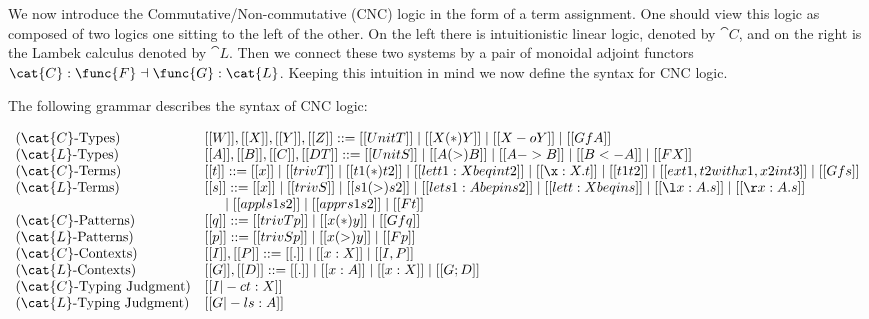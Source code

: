 We now introduce the Commutative/Non-commutative (CNC) logic in the
form of a term assignment.  One should view this logic as composed of
two logics one sitting to the left of the other.  On the left there is
intuitionistic linear logic, denoted by $\cat{C}$, and on the right is
the Lambek calculus denoted by $\cat{L}$.  Then we connect these two
systems by a pair of monoidal adjoint functors $\cat{C} : \func{F}
\dashv \func{G} : \cat{L}$.  Keeping this intuition in mind we now
define the syntax for CNC logic.
\begin{definition}
  \label{def:Lambek-syntax}
  The following grammar describes the syntax of CNC logic:
  \begin{center}\vspace{-5px}
    \begin{math}
      \begin{array}{lll}        
        \text{($\cat{C}$-Types)} & [[W]],[[X]],[[Y]],[[Z]] ::= [[UnitT]] \mid [[X (*) Y]] \mid [[X -o Y]] \mid [[Gf A]]\\
        \text{($\cat{L}$-Types)} & [[A]],[[B]],[[C]],[[DT]] ::= [[UnitS]] \mid [[A (>) B]] \mid [[A -> B]] \mid [[B <- A]] \mid [[F X]]\\        
        \text{($\cat{C}$-Terms)} & [[t]] ::= [[x]] \mid [[trivT]] \mid [[t1 (*) t2]] \mid [[let t1 : X be q in t2]] \mid [[\x:X.t]] \mid [[t1 t2]] \mid [[ex t1 , t2 with x1 , x2 in t3]] \mid [[Gf s]]\\
        \text{($\cat{L}$-Terms)} & [[s]] ::= [[x]] \mid [[trivS]] \mid [[s1 (>) s2]] \mid [[let s1 : A be p in s2]] \mid [[let t : X be q in s]] \mid [[\l x : A.s]] \mid [[\r x : A . s]] \\
        & \,\,\,\,\,\,\,\,\,\mid [[appl s1 s2]] \mid [[appr s1 s2]] \mid [[F t]]\\        
        \text{($\cat{C}$-Patterns)} & [[q]] ::= [[trivTp]] \mid [[x (*) y]] \mid [[Gf q]]\\
        \text{($\cat{L}$-Patterns)} & [[p]] ::= [[trivSp]] \mid [[x (>) y]] \mid [[F p]]\\        
        \text{($\cat{C}$-Contexts)} & [[I]],[[P]] ::= [[.]] \mid [[x : X]] \mid [[I,P]]\\
        \text{($\cat{L}$-Contexts)} & [[G]],[[D]] ::= [[.]] \mid [[x : A]] \mid [[x : X]] \mid [[G;D]]\\        
        \text{($\cat{C}$-Typing Judgment)} & [[I |-c t : X]]\\
        \text{($\cat{L}$-Typing Judgment)} & [[G |-l s : A]]\\
      \end{array}
    \end{math}
  \end{center}
\end{definition}

